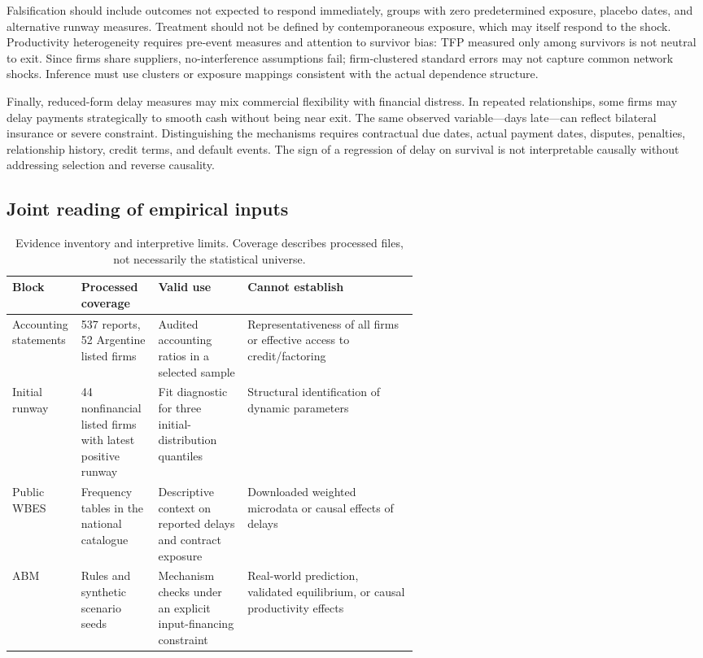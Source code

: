 \documentclass[11pt,a4paper]{article}
\begin{document}
Falsification should include outcomes not expected to respond immediately, groups with zero predetermined exposure, placebo dates, and alternative runway measures. Treatment should not be defined by contemporaneous exposure, which may itself respond to the shock. Productivity heterogeneity requires pre-event measures and attention to survivor bias: TFP measured only among survivors is not neutral to exit. Since firms share suppliers, no-interference assumptions fail; firm-clustered standard errors may not capture common network shocks. Inference must use clusters or exposure mappings consistent with the actual dependence structure.

Finally, reduced-form delay measures may mix commercial flexibility with financial distress. In repeated relationships, some firms may delay payments strategically to smooth cash without being near exit. The same observed variable—days late—can reflect bilateral insurance or severe constraint. Distinguishing the mechanisms requires contractual due dates, actual payment dates, disputes, penalties, relationship history, credit terms, and default events. The sign of a regression of delay on survival is not interpretable causally without addressing selection and reverse causality.

\subsection{Joint reading of empirical inputs}
\begin{table}[htbp]\centering\small
\begin{tabularx}{\linewidth}{p{0.17\linewidth}p{0.19\linewidth}p{0.22\linewidth}X}
\toprule
Block & Processed coverage & Valid use & Cannot establish\\
\midrule
Accounting statements & 537 reports, 52 Argentine listed firms & Audited accounting ratios in a selected sample & Representativeness of all firms or effective access to credit/factoring\\
Initial runway & 44 nonfinancial listed firms with latest positive runway & Fit diagnostic for three initial-distribution quantiles & Structural identification of dynamic parameters\\
Public WBES & Frequency tables in the national catalogue & Descriptive context on reported delays and contract exposure & Downloaded weighted microdata or causal effects of delays\\
ABM & Rules and synthetic scenario seeds & Mechanism checks under an explicit input-financing constraint & Real-world prediction, validated equilibrium, or causal productivity effects\\
\bottomrule
\end{tabularx}
\caption{Evidence inventory and interpretive limits. Coverage describes processed files, not necessarily the statistical universe.}\label{tab:evidence_inventory}
\end{table}
\end{document}
